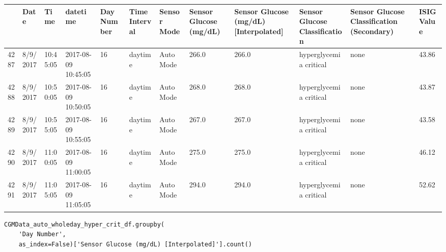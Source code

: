 \bigskip\noindent
\begin{tabular}{p{}p{}p{}p{}p{}p{}p{}p{}p{}p{}p{}p{}}
\toprule
 & Date & Time & datetime & Day Number & Time Interval & Sensor Mode & Sensor Glucose (mg/dL) & Sensor Glucose (mg/dL) [Interpolated] & Sensor Glucose Classification & Sensor Glucose Classification (Secondary) & ISIG Value \\
\hline
4287 & 8/9/2017 & 10:45:05 & 2017-08-09 10:45:05 & 16 & daytime & Auto Mode & 266.0 & 266.0 & hyperglycemia critical & none & 43.86 \\
\hline
4288 & 8/9/2017 & 10:50:05 & 2017-08-09 10:50:05 & 16 & daytime & Auto Mode & 268.0 & 268.0 & hyperglycemia critical & none & 43.87 \\
\hline
4289 & 8/9/2017 & 10:55:05 & 2017-08-09 10:55:05 & 16 & daytime & Auto Mode & 267.0 & 267.0 & hyperglycemia critical & none & 43.58 \\
\hline
4290 & 8/9/2017 & 11:00:05 & 2017-08-09 11:00:05 & 16 & daytime & Auto Mode & 275.0 & 275.0 & hyperglycemia critical & none & 46.12 \\
\hline
4291 & 8/9/2017 & 11:05:05 & 2017-08-09 11:05:05 & 16 & daytime & Auto Mode & 294.0 & 294.0 & hyperglycemia critical & none & 52.62 \\
\hline
\bottomrule
\end{tabular}

\bigskip

\begin{verbatim}
CGMData_auto_wholeday_hyper_crit_df.groupby(
    'Day Number', 
    as_index=False)['Sensor Glucose (mg/dL) [Interpolated]'].count()
\end{verbatim}

